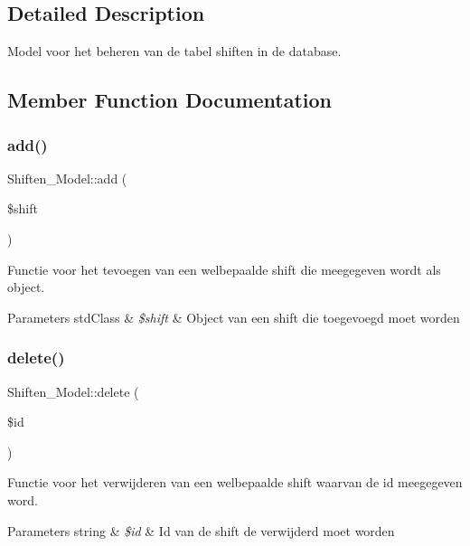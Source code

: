 \subsection{Detailed Description}
Model voor het beheren van de tabel shiften in de database. 

\subsection{Member Function Documentation}
\mbox{\label{class_shiften___model_ae95a20c13c92700b673c4b850a084b85}} 
\subsubsection{\texorpdfstring{add()}{add()}}
{\footnotesize\ttfamily Shiften\+\_\+\+Model\+::add (\begin{DoxyParamCaption}\item[{}]{\$shift }\end{DoxyParamCaption})}

Functie voor het tevoegen van een welbepaalde shift die meegegeven wordt als object. 
\begin{DoxyParams}[1]{Parameters}
std\+Class & {\em \$shift} & Object van een shift die toegevoegd moet worden \\
\hline
\end{DoxyParams}
\mbox{\label{class_shiften___model_aa8ebb0f37babc9dbfc4c026f0a73d6e6}} 
\subsubsection{\texorpdfstring{delete()}{delete()}}
{\footnotesize\ttfamily Shiften\+\_\+\+Model\+::delete (\begin{DoxyParamCaption}\item[{}]{\$id }\end{DoxyParamCaption})}

Functie voor het verwijderen van een welbepaalde shift waarvan de id meegegeven word. 
\begin{DoxyParams}[1]{Parameters}
string & {\em \$id} & Id van de shift de verwijderd moet worden \\
\hline
\end{DoxyParams}
\mbox{\label{class_shiften___model_a0e222557a11630559c7eaa6ca29c55a6}} 

